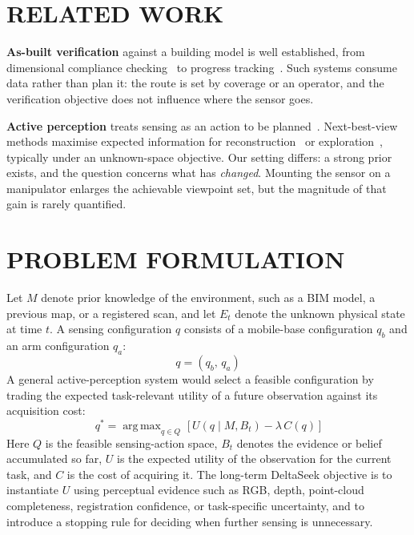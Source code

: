 \documentclass[letterpaper, 10 pt, conference]{ieeeconf}
\DeclareMathOperator*{\argmax}{arg\,max}
\begin{document}
\section{RELATED WORK}

\textbf{As-built verification} against a building model is well established,
from dimensional compliance checking~\cite{bosche2010} to progress
tracking~\cite{turkan2012,golparvar2015}. Such systems consume data rather than
plan it: the route is set by coverage or an operator, and the verification
objective does not influence where the sensor goes.

\textbf{Active perception} treats sensing as an action to be
planned~\cite{bajcsy1988,aloimonos1988}. Next-best-view methods maximise
expected information for reconstruction~\cite{connolly1985,isler2016} or
exploration~\cite{bircher2016,yamauchi1997}, typically under an unknown-space
objective. Our setting differs: a strong prior exists, and the question
concerns what has \emph{changed}. Mounting the sensor on a manipulator enlarges
the achievable viewpoint set, but the magnitude of that gain is rarely
quantified.

\section{PROBLEM FORMULATION}

Let $M$ denote prior knowledge of the environment, such as a BIM model, a
previous map, or a registered scan, and let $E_t$ denote the unknown physical
state at time $t$. A sensing configuration $q$ consists of a mobile-base
configuration $q_b$ and an arm configuration $q_a$:
\begin{equation}
  q = \left( q_b,\, q_a \right)
\end{equation}
A general active-perception system would select a feasible configuration by
trading the expected task-relevant utility of a future observation against its
acquisition cost:
\begin{equation}
  q^{\ast} = \argmax_{q \in Q}\;
  \bigl[\, U\!\left(q \mid M, B_t\right) - \lambda\, C(q) \,\bigr]
\end{equation}
Here $Q$ is the feasible sensing-action space, $B_t$ denotes the evidence or
belief accumulated so far, $U$ is the expected utility of the observation for
the current task, and $C$ is the cost of acquiring it. The long-term DeltaSeek
objective is to instantiate $U$ using perceptual evidence such as RGB, depth,
point-cloud completeness, registration confidence, or task-specific
uncertainty, and to introduce a stopping rule for deciding when further sensing
is unnecessary.
\end{document}
